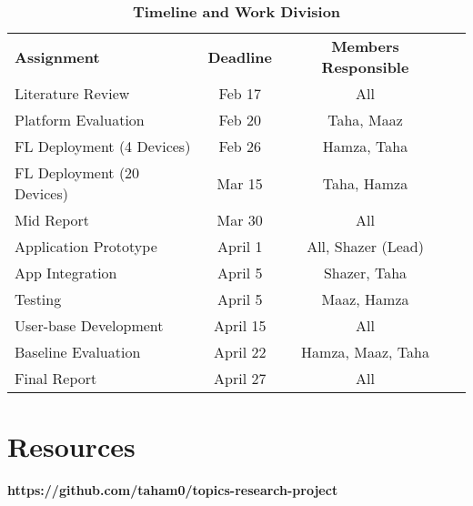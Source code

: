 \begin{table}
    \footnotesize
    \centering
    \begin{tabular}{lccc}
        \textbf{Assignment} & \textbf{Deadline}  & \textbf{Members Responsible}\\
        
        Literature Review                       & Feb 17          & All                     \\
        Platform Evaluation                     & Feb 20          & Taha, Maaz            \\
        FL Deployment (4 Devices)      & Feb 26          & Hamza, Taha             \\
        FL Deployment (20 Devices)     & Mar 15          & Taha, Hamza             \\
        Mid Report                              & Mar 30          & All                     \\
        Application Prototype                   & April 1         & All, Shazer (Lead)            \\
        App Integration                             & April 5         & Shazer, Taha        \\
        Testing                                 & April 5         & Maaz, Hamza         \\
        User-base Development                   & April 15        & All                 \\
        Baseline Evaluation                     & April 22        & Hamza, Maaz, Taha   \\
        Final Report                            & April 27        & All \\
    \end{tabular}

    \caption{
        {\bf Timeline and Work Division}
    }
\end{table}

\section{Resources}
    \textbf{https://github.com/taham0/topics-research-project}